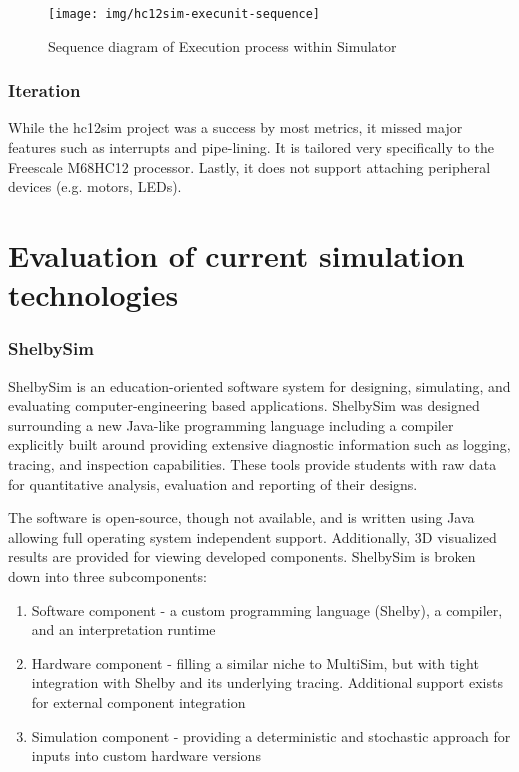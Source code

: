 \begin{figure}[ph!]
    \centering
    \texttt{[image: img/hc12sim-execunit-sequence]}
    \caption{Sequence diagram of Execution process within Simulator}
    \label{fig:hc12sim-execunit-sequence}
\end{figure} 

\subsubsection*{Iteration}

While the hc12sim project was a success by most metrics, it missed major features such as interrupts and pipe-lining. It is tailored very specifically to the Freescale M68HC12 processor. Lastly, it does not support attaching peripheral devices (e.g. motors, LEDs). 

\section{Evaluation of current simulation technologies} 




\subsubsection{ShelbySim}

\cite{Tappan2009}

ShelbySim is an education-oriented software system for designing, simulating, and evaluating computer-engineering based applications. ShelbySim was designed surrounding a new Java-like programming language including a compiler explicitly built around providing extensive diagnostic information such as logging, tracing, and inspection capabilities. These tools provide students with raw data for quantitative analysis, evaluation and reporting of their designs. 

The software is open-source, though not available, and is written using Java allowing full operating system independent support. Additionally, 3D visualized results are provided for viewing developed components. ShelbySim is broken down into three subcomponents:
\begin{enumerate}
\item Software component - a custom programming language (Shelby), a compiler, and an interpretation runtime
\item Hardware component - filling a similar niche to MultiSim, but with tight integration with Shelby and its underlying tracing. Additional support exists for external component integration
\item Simulation component - providing a deterministic and stochastic approach for inputs into custom hardware versions
\end{enumerate} 

